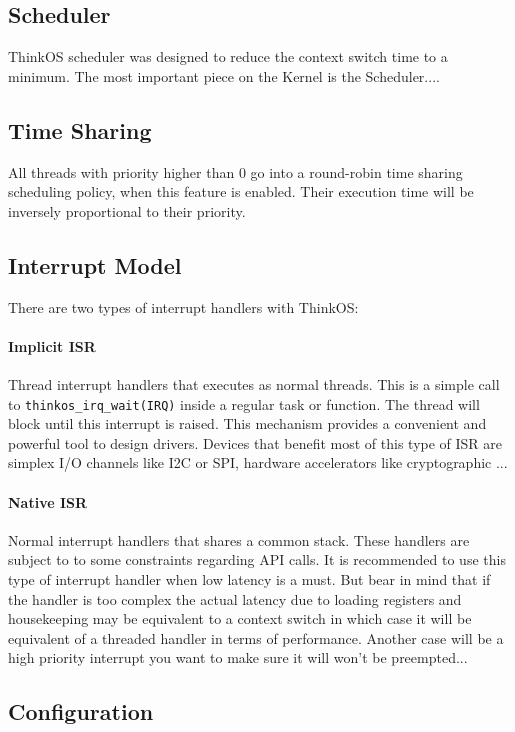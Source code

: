 \subsection{Scheduler}
ThinkOS scheduler was designed to reduce the context switch time to a minimum. The most important piece on the Kernel is the Scheduler....

\subsection{Time Sharing}
All threads with priority higher than 0 go into a round-robin time sharing scheduling policy, when this feature is enabled. Their execution time will be inversely proportional to their priority.

\subsection{Interrupt Model}
There are two types of interrupt handlers with ThinkOS:

\paragraph{Implicit ISR}{Thread interrupt handlers that executes as normal threads. This is a simple call to \lstinline{thinkos_irq_wait(IRQ)} inside a regular task or function. The thread will block until this interrupt is raised. This mechanism provides a convenient and powerful tool to design drivers. Devices that benefit most of this type of ISR are simplex I/O channels like I2C or SPI, hardware accelerators like cryptographic ...}

\paragraph{Native ISR}{Normal interrupt handlers that shares a common stack. These handlers are subject to to some constraints regarding API calls. It is recommended to use this type of interrupt handler when low latency is a must. But bear in mind that if the handler is too complex the actual latency due to loading registers and housekeeping may be equivalent to a context switch in which case it will be equivalent of a threaded handler in terms of performance. Another case will be a high priority interrupt you want to make sure it will won't be preempted...}

\subsection{Configuration}



